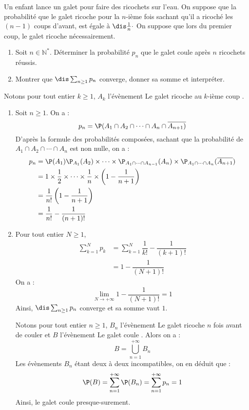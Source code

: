 \documentclass[a4paper,10pt]{report}
\begin{document}
\begin{Exa} Un enfant lance un galet pour faire des ricochets sur l'eau. On suppose que la probabilité que le galet ricoche pour la $n$-ième fois sachant qu'il a ricoché les $(n-1)$ coups d'avant, est égale à $\dis \frac{1}{n}\cdot$ On suppose que lors du premier coup, le galet ricoche nécessairement.
\begin{enumerate}
\item Soit $n \in \mathbb{N}^*$. Déterminer la probabilité $p_n$ que le galet coule après $n$ ricochets réussis.
\item Montrer que $\dis \sum_{n \geq 1} p_n$ converge, donner sa somme et interpréter.
\end{enumerate}
\end{Exa}

\corr Notons pour tout entier $k \geq 1$, $A_k$ l'évènement \og Le galet ricoche au $k$-ième coup \fg.

\begin{enumerate}
\item Soit $n \geq 1$. On a :
$$ p_n = \P(A_1 \cap A_2 \cap \cdots \cap A_n \cap \overline{A_{n+1})}$$
D'après la formule des probabilités composées, sachant que la probabilité de $A_1 \cap A_2 \cap \cdots \cap A_n $ est non nulle, on a :
\begin{align*}
p_n & = \P(A_1) \P_{A_1}(A_2) \times \cdots \times \P_{A_1 \cap \cdots \cap A_{n-1}}(A_n) \times \P_{A_1 \cap \cdots \cap A_{n}}(\overline{A_{n+1}}) \\
& = 1 \times \dfrac{1}{2} \times \cdots \times \dfrac{1}{n} \times \left(1- \dfrac{1}{n+1} \right) \\
& = \dfrac{1}{n!} \left(1- \dfrac{1}{n+1} \right) \\
& = \dfrac{1}{n!} - \dfrac{1}{(n+1)!}
\end{align*}
\item Pour tout entier $N \geq 1$,
\begin{align*}
\sum_{k=1}^N p_k & = \sum_{k=1}^N \dfrac{1}{k!} - \dfrac{1}{(k+1)!} \\
& = 1- \dfrac{1}{(N+1)!}
\end{align*}
On a :
$$ \lim_{N \rightarrow + \infty}  1- \dfrac{1}{(N+1)!} = 1$$
Ainsi, $\dis \sum_{n \geq 1} p_n$ converge et sa somme vaut $1$.

\medskip

\noindent Notons pour tout entier $n \geq 1$, $B_n$ l'évènement \og Le galet ricoche $n$ fois avant de couler \fg et $B$ l'évènement \og Le galet coule \fg{}. Alors on a :
$$ B = \bigcup_{n=1}^{+ \infty} B_n$$
Les évènements $B_n$ étant deux à deux incompatibles, on en déduit que :
$$ \P(B) = \sum_{n=1}^{+ \infty} \P(B_n) =  \sum_{n=1}^{+ \infty} p_n = 1$$
Ainsi, le galet coule presque-surement.
\end{enumerate}
\end{document}
